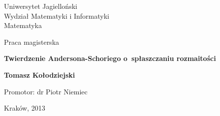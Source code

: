 \pagestyle{empty}

\noindent
\begin{center}
    \Large
    Uniwersytet Jagielloński\\
    Wydział Matematyki i Informatyki\\
    Matematyka
\end{center}

\vfill\vfill
\begin{center}
    \large
    Praca magisterska
\end{center}

\vfill
\begin{center}
    \Huge\bfseries
    Twierdzenie Andersona-Schoriego o~spłaszczaniu rozmaitości
\end{center}

\vfill
\begin{center}
    \Huge\bfseries
    Tomasz Kołodziejski
\end{center}

\vfill\vfill\vfill
\begin{center}
    \Large
    Promotor: dr Piotr Niemiec
\end{center}

\vfill
\begin{center}
\large
    Kraków, 2013
\end{center}

\cleardoublepage
\tableofcontents
